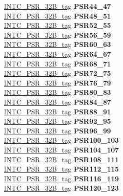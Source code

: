 \begin{DoxyCompactItemize}
\begin{tabbing}
\>\>\mbox{\hyperlink{unionINTC__PSR__32B__tag}{INTC\_PSR\_32B\_tag}} {\bfseries PSR44\_47}\\
\>\>\mbox{\hyperlink{unionINTC__PSR__32B__tag}{INTC\_PSR\_32B\_tag}} {\bfseries PSR48\_51}\\
\>\>\mbox{\hyperlink{unionINTC__PSR__32B__tag}{INTC\_PSR\_32B\_tag}} {\bfseries PSR52\_55}\\
\>\>\mbox{\hyperlink{unionINTC__PSR__32B__tag}{INTC\_PSR\_32B\_tag}} {\bfseries PSR56\_59}\\
\>\>\mbox{\hyperlink{unionINTC__PSR__32B__tag}{INTC\_PSR\_32B\_tag}} {\bfseries PSR60\_63}\\
\>\>\mbox{\hyperlink{unionINTC__PSR__32B__tag}{INTC\_PSR\_32B\_tag}} {\bfseries PSR64\_67}\\
\>\>\mbox{\hyperlink{unionINTC__PSR__32B__tag}{INTC\_PSR\_32B\_tag}} {\bfseries PSR68\_71}\\
\>\>\mbox{\hyperlink{unionINTC__PSR__32B__tag}{INTC\_PSR\_32B\_tag}} {\bfseries PSR72\_75}\\
\>\>\mbox{\hyperlink{unionINTC__PSR__32B__tag}{INTC\_PSR\_32B\_tag}} {\bfseries PSR76\_79}\\
\>\>\mbox{\hyperlink{unionINTC__PSR__32B__tag}{INTC\_PSR\_32B\_tag}} {\bfseries PSR80\_83}\\
\>\>\mbox{\hyperlink{unionINTC__PSR__32B__tag}{INTC\_PSR\_32B\_tag}} {\bfseries PSR84\_87}\\
\>\>\mbox{\hyperlink{unionINTC__PSR__32B__tag}{INTC\_PSR\_32B\_tag}} {\bfseries PSR88\_91}\\
\>\>\mbox{\hyperlink{unionINTC__PSR__32B__tag}{INTC\_PSR\_32B\_tag}} {\bfseries PSR92\_95}\\
\>\>\mbox{\hyperlink{unionINTC__PSR__32B__tag}{INTC\_PSR\_32B\_tag}} {\bfseries PSR96\_99}\\
\>\>\mbox{\hyperlink{unionINTC__PSR__32B__tag}{INTC\_PSR\_32B\_tag}} {\bfseries PSR100\_103}\\
\>\>\mbox{\hyperlink{unionINTC__PSR__32B__tag}{INTC\_PSR\_32B\_tag}} {\bfseries PSR104\_107}\\
\>\>\mbox{\hyperlink{unionINTC__PSR__32B__tag}{INTC\_PSR\_32B\_tag}} {\bfseries PSR108\_111}\\
\>\>\mbox{\hyperlink{unionINTC__PSR__32B__tag}{INTC\_PSR\_32B\_tag}} {\bfseries PSR112\_115}\\
\>\>\mbox{\hyperlink{unionINTC__PSR__32B__tag}{INTC\_PSR\_32B\_tag}} {\bfseries PSR116\_119}\\
\>\>\mbox{\hyperlink{unionINTC__PSR__32B__tag}{INTC\_PSR\_32B\_tag}} {\bfseries PSR120\_123}\\

\end{tabbing}
\end{DoxyCompactItemize}
